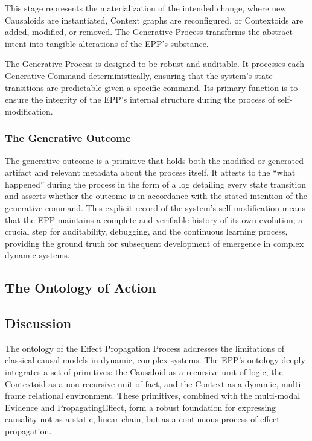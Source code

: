 This stage represents the materialization of the intended change, where new Causaloids are instantiated, Context graphs are reconfigured, or Contextoids are added, modified, or removed. The Generative Process transforms the abstract intent into tangible alterations of the EPP's substance.

The Generative Process is designed to be robust and auditable. It processes each Generative Command deterministically, ensuring that the system's state transitions are predictable given a specific command. Its primary function is to ensure the integrity of the EPP's internal structure during the process of self-modification. 


\subsubsection{The Generative Outcome}
\label{sec:ontology_emgerence_gen_outcome}

The generative outcome is a primitive that holds both the modified or generated artifact and relevant metadata about the process itself. It attests to the “what happened” during the process in the form of a log detailing every state transition and asserts whether the outcome is in accordance with the stated intention of the generative command. This explicit record of the system's self-modification means that the EPP maintains a complete and verifiable history of its own evolution; a crucial step for auditability, debugging, and the continuous learning process, providing the ground truth for subsequent development of emergence in complex dynamic systems.



\subsection{The Ontology of Action}
\label{sec:ontology_action}

\newpage

\subsection{Discussion}
\label{sec:ontology_discussion}

The ontology of the Effect Propagation Process addresses the limitations of classical causal models in dynamic, complex systems. The EPP's ontology deeply integrates a set of primitives: the Causaloid as a recursive unit of logic, the Contextoid as a non-recursive unit of fact, and the Context as a dynamic, multi-frame relational environment. These primitives, combined with the multi-modal Evidence and PropagatingEffect, form a robust foundation for expressing causality not as a static, linear chain, but as a continuous process of effect propagation. 

